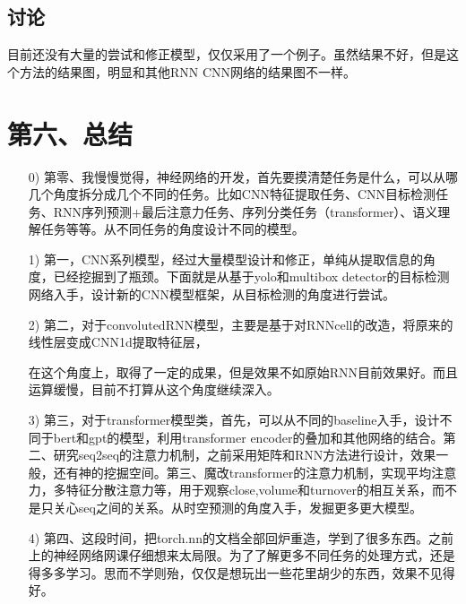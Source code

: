 \documentclass[11pt]{ctexart}
\begin{document}
\subsection{讨论}
目前还没有大量的尝试和修正模型，仅仅采用了一个例子。虽然结果不好，但是这个方法的结果图，明显和其他RNN CNN网络的结果图不一样。

\section{第六、总结}
\begin{itemize}
  \item [0)]
  第零、我慢慢觉得，神经网络的开发，首先要摸清楚任务是什么，可以从哪几个角度拆分成几个不同的任务。比如CNN特征提取任务、CNN目标检测任务、RNN序列预测+最后注意力任务、序列分类任务（transformer）、语义理解任务等等。从不同任务的角度设计不同的模型。
  \item [1)]
  第一，CNN系列模型，经过大量模型设计和修正，单纯从提取信息的角度，已经挖掘到了瓶颈。下面就是从基于yolo和multibox detector的目标检测网络入手，设计新的CNN模型框架，从目标检测的角度进行尝试。
  \item [2)]
  第二，对于convolutedRNN模型，主要是基于对RNNcell的改造，将原来的线性层变成CNN1d提取特征层，\par 在这个角度上，取得了一定的成果，但是效果不如原始RNN目前效果好。而且运算缓慢，目前不打算从这个角度继续深入。
  \item [3)]
  第三，对于transformer模型类，首先，可以从不同的baseline入手，设计不同于bert和gpt的模型，利用transformer encoder的叠加和其他网络的结合。第二、研究seq2seq的注意力机制，之前采用矩阵和RNN方法进行设计，效果一般，还有神的挖掘空间。第三、魔改transformer的注意力机制，实现平均注意力，多特征分散注意力等，用于观察close,volume和turnover的相互关系，而不是只关心seq之间的关系。从时空预测的角度入手，发掘更多更大模型。
  \item [4)]
  第四、这段时间，把torch.nn的文档全部回炉重造，学到了很多东西。之前上的神经网络网课仔细想来太局限。为了了解更多不同任务的处理方式，还是得多多学习。思而不学则殆，仅仅是想玩出一些花里胡少的东西，效果不见得好。
\end{itemize}
\end{document}
